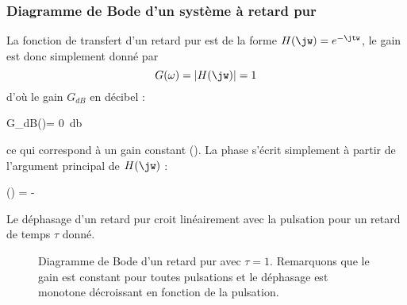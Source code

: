 \subsubsection{Diagramme de Bode d'un système à retard pur}
La fonction de transfert d'un retard pur est de la forme $H(\jw)=e^{-\jtw}$,
le gain est donc simplement donné par
\[
G(\omega)=|H(\jw)|=1
\]
d'où le gain $G_{dB}$ en décibel :
\begin{bequation}
    G_{dB}(\omega)= \SI{0}{\decibel}
\end{bequation}
ce qui correspond à un gain constant ().
La phase s'écrit simplement à partir de l'argument principal de $H(\jw)$ :
\begin{bequation}
    \phi(\omega) = -\tau\omega
\end{bequation}
Le déphasage d'un retard pur croit linéairement avec la pulsation pour un 
retard de temps $\tau$ donné.
\begin{figure}[!htb]
    \centering
    

    
    \caption{Diagramme de Bode d'un retard pur 
             avec $\tau=1$. Remarquons que le gain est constant pour toutes 
             pulsations et le déphasage est monotone décroissant en fonction 
             de la pulsation\label{fig-bode_retard_1}.}
\end{figure}
\newpage
